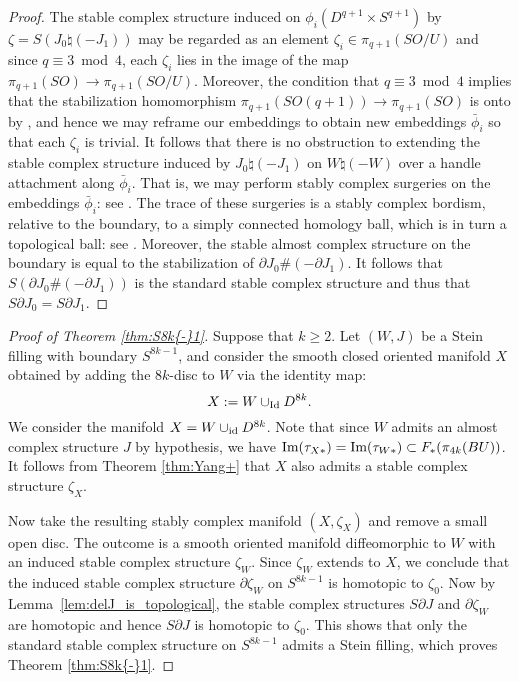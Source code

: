 \documentclass[12pt]{amsart}
\newcommand\Id{\textup{id}}
\newcommand\acxs{J}						%
\newcommand\scxs{\zeta}					%
\newcommand\im{\textup{Im}}
\newcommand\del{\partial}
\theoremstyle{remark}
\newcommand{\jbcomm}[1]{\begingroup\color{green}JB:~#1\endgroup}
\begin{document}
\begin{proof}
The stable complex structure induced on 
$\phi_i(D^{q{+}1} \times S^{q{+}1})$ by 
$\scxs = S(J_0 \natural (-J_1))$ may be regarded as an element 
$\scxs_i \in \pi_{q{+}1}(SO/U)$ and since $q \equiv 3$~mod~$4$, each $\scxs_i$ lies
in the image of the map $\pi_{q{+}1}(SO) \to \pi_{q{+}1}(SO/U)$.  Moreover, the condition that $q
\equiv 3$~mod~$4$ implies that the stabilization homomorphism
$\pi_{q{+}1}(SO(q{+}1)) \to \pi_{q{+}1}(SO)$ is onto by \cite{Kervaire60},
and hence we may reframe our embeddings to obtain new embeddings $\bar
\phi_i$ so that each $\scxs_i$ is trivial.  It follows that there is no
obstruction to extending the stable complex structure induced by 
$J_0 \natural (-J_1)$ on $W \natural (-W)$ over a handle attachment along $\bar
\phi_i$.  That is, we may perform stably complex surgeries on the
embeddings $\bar \phi_i$: see \cite[Section 2.3]{BCS1}.
The trace of these surgeries is a stably complex bordism, relative to
the boundary, to a simply connected homology ball, which is in turn a
topological ball: see \cite[Lemma 7.1]{Kervaire-Milnor63}.
Moreover, the stable almost complex structure on the
boundary is equal to the stabilization of $\del \acxs_0 \# (-\del
\acxs_1)$. It follows that $S(\del \acxs_0 \#(-\del \acxs_1)) $ is the
standard stable complex structure and thus that $S\del \acxs_0 = S\del
\acxs_1$.
\end{proof}	

\begin{proof}[Proof of Theorem \ref{thm:S8k{-}1}]
Suppose that $k  \geq2$.
Let $(W, J)$ be a Stein filling with boundary $S^{8k{-}1}$, and
consider  the smooth closed
oriented manifold $X$
obtained by adding the $8k$-disc to $W$ via the identity map:
%
\[ X : = W \cup_{\rm Id} D^{8k}.  \]
%
We consider the manifold $X = W \cup_{\Id}
D^{8k}$. Note that since $W$ admits an almost complex structure
$\acxs$ by hypothesis, we have $\im(\tau_{X*}) = \im(\tau_{W*})
\subset F_*(\pi_{4k}(BU))$.  It follows from Theorem \ref{thm:Yang+} that $X$ also admits a stable complex
structure $\scxs_X$.

Now take the resulting stably complex manifold $(X, \scxs_X)$ and
remove a small open disc.  The outcome is a smooth oriented manifold
diffeomorphic to $W$ with an induced stable complex structure
$\scxs_W$.  Since $\scxs_W$ extends to $X$, we conclude that the
induced stable complex structure $\del \scxs_W$ on $S^{8k{-}1}$ is
homotopic to $\scxs_0$.  Now by Lemma~\ref{lem:delJ_is_topological}, 
the stable complex structures $S \del J$ and $\del \scxs_W$ are
homotopic and hence $S \del J$ is homotopic to $\scxs_0$.  This shows
that only the standard stable complex structure on $S^{8k{-}1}$ admits a
Stein filling, which proves Theorem \ref{thm:S8k{-}1}.
%
\end{proof}
\end{document}

